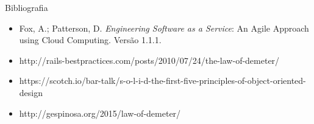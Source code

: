 \documentclass[10pt]{beamer}
\begin{document}
\begin{frame}{Bibliografia}{}
  \begin{itemize}
    \item Fox, A.; Patterson, D. \textit{Engineering Software as a Service}: An Agile Approach using Cloud Computing. Versão 1.1.1.
    \item http://rails-bestpractices.com/posts/2010/07/24/the-law-of-demeter/
    \item https://scotch.io/bar-talk/s-o-l-i-d-the-first-five-principles-of-object-oriented-design
    \item http://gespinosa.org/2015/law-of-demeter/
  \end{itemize}
\end{frame}

{\1
\begin{frame}
\end{frame}}
\end{document}
